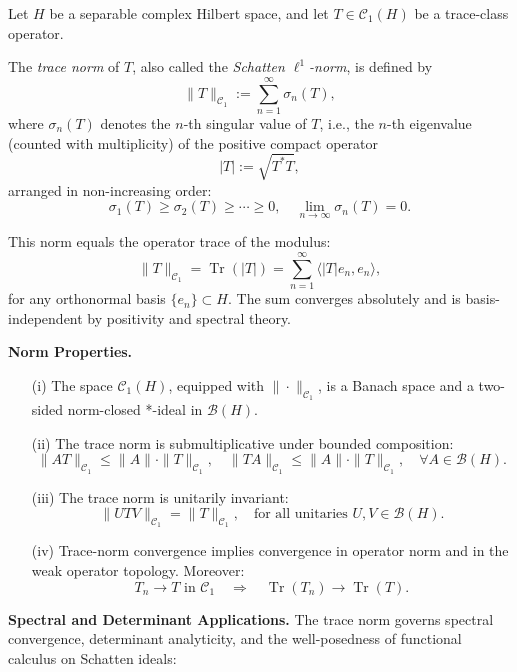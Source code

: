 \begin{definition}\label{def:trace-norm}
Let \( H \) be a separable complex Hilbert space, and let \( T \in \mathcal{C}_1(H) \) be a trace-class operator.

The \emph{trace norm} of \( T \), also called the \emph{Schatten \( \ell^1 \)-norm}, is defined by
\[
\| T \|_{\mathcal{C}_1} := \sum_{n=1}^\infty \sigma_n(T),
\]
where \( \sigma_n(T) \) denotes the \( n \)-th singular value of \( T \), i.e., the \( n \)-th eigenvalue (counted with multiplicity) of the positive compact operator
\[
|T| := \sqrt{T^* T},
\]
arranged in non-increasing order:
\[
\sigma_1(T) \ge \sigma_2(T) \ge \cdots \ge 0, \quad \lim_{n \to \infty} \sigma_n(T) = 0.
\]

This norm equals the operator trace of the modulus:
\[
\| T \|_{\mathcal{C}_1} = \operatorname{Tr}(|T|) = \sum_{n=1}^\infty \langle |T| e_n, e_n \rangle,
\]
for any orthonormal basis \( \{ e_n \} \subset H \). The sum converges absolutely and is basis-independent by positivity and spectral theory.

\medskip
\noindent\textbf{Norm Properties.}
\begin{enumerate}
    \item[\textup{(i)}] The space \( \mathcal{C}_1(H) \), equipped with \( \| \cdot \|_{\mathcal{C}_1} \), is a Banach space and a two-sided norm-closed *-ideal in \( \mathcal{B}(H) \).
    
    \item[\textup{(ii)}] The trace norm is submultiplicative under bounded composition:
    \[
    \| AT \|_{\mathcal{C}_1} \le \|A\| \cdot \|T\|_{\mathcal{C}_1}, \quad
    \| TA \|_{\mathcal{C}_1} \le \|A\| \cdot \|T\|_{\mathcal{C}_1}, \quad \forall A \in \mathcal{B}(H).
    \]

    \item[\textup{(iii)}] The trace norm is unitarily invariant:
    \[
    \| U T V \|_{\mathcal{C}_1} = \|T\|_{\mathcal{C}_1}, \quad \text{for all unitaries } U, V \in \mathcal{B}(H).
    \]

    \item[\textup{(iv)}] Trace-norm convergence implies convergence in operator norm and in the weak operator topology. Moreover:
    \[
    T_n \to T \text{ in } \mathcal{C}_1 \quad \Rightarrow \quad \operatorname{Tr}(T_n) \to \operatorname{Tr}(T).
    \]
\end{enumerate}

\medskip
\noindent\textbf{Spectral and Determinant Applications.}
The trace norm governs spectral convergence, determinant analyticity, and the well-posedness of functional calculus on Schatten ideals:


\end{definition}
